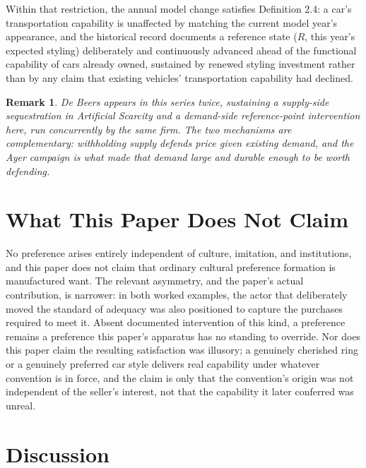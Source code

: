 \documentclass[11pt]{article}
\newtheorem{remark}[definition]{Remark}
\begin{document}
Within that restriction, the annual model change satisfies Definition 2.4: a car's transportation capability is unaffected by matching the current model year's appearance, and the historical record documents a reference state ($R$, this year's expected styling) deliberately and continuously advanced ahead of the functional capability of cars already owned, sustained by renewed styling investment rather than by any claim that existing vehicles' transportation capability had declined.

\begin{remark}
De Beers appears in this series twice, sustaining a supply-side sequestration in \emph{Artificial Scarcity} and a demand-side reference-point intervention here, run concurrently by the same firm. The two mechanisms are complementary: withholding supply defends price given existing demand, and the Ayer campaign is what made that demand large and durable enough to be worth defending.
\end{remark}

\section{What This Paper Does Not Claim}

No preference arises entirely independent of culture, imitation, and institutions, and this paper does not claim that ordinary cultural preference formation is manufactured want. The relevant asymmetry, and the paper's actual contribution, is narrower: in both worked examples, the actor that deliberately moved the standard of adequacy was also positioned to capture the purchases required to meet it. Absent documented intervention of this kind, a preference remains a preference this paper's apparatus has no standing to override. Nor does this paper claim the resulting satisfaction was illusory; a genuinely cherished ring or a genuinely preferred car style delivers real capability under whatever convention is in force, and the claim is only that the convention's origin was not independent of the seller's interest, not that the capability it later conferred was unreal.

\section{Discussion}
\end{document}
